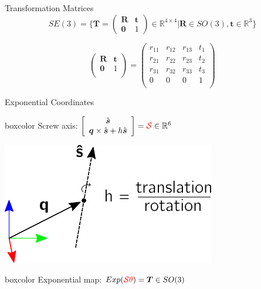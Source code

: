 \documentclass[14pt]{beamer}
\begin{document}
\begin{frame}{Transformation Matrices}
\[
SE(3) = \biggl\{ \boldsymbol{T} = \left(
\begin{array}{cc}
\boldsymbol{R} & \boldsymbol{t}\\
\boldsymbol{0} & 1
\end{array}
\right) \in \mathbb{R}^{4 \times 4}
| \boldsymbol{R} \in SO(3), \boldsymbol{t} \in \mathbb{R}^3 \biggr\}
\]

\[
\left( \begin{array}{cc}
    \boldsymbol R & \boldsymbol t\\
    \boldsymbol 0 & 1\\
\end{array} \right)
=
\left(
\begin{matrix}
r_{11} & r_{12} & r_{13} & t_1\\
r_{21} & r_{22} & r_{23} & t_2\\
r_{31} & r_{32} & r_{33} & t_3\\
0 & 0 & 0 & 1\\
\end{matrix}
\right)
\]
\end{frame}

\begin{frame}{Exponential Coordinates}
\begin{beamercolorbox}[wd=\textwidth,sep=1em]{boxcolor}
Screw axis: $\left[ \begin{array}{c}\hat{\boldsymbol{s}} \\ \boldsymbol{q} \times \hat{\boldsymbol{s}} + h \hat{\boldsymbol{s}}\end{array} \right] = \textcolor{red}{\mathcal{S}} \in \mathbb{R}^6$
\end{beamercolorbox}

\vfill

\hfill\includegraphics{images/screw_axis}

\vfill

\begin{beamercolorbox}[wd=\textwidth,sep=1em]{boxcolor}
Exponential map: $Exp(\textcolor{red}{\mathcal{S}\theta}) = \boldsymbol{T}
\in SO(3)$
\end{beamercolorbox}
\end{frame}
\end{document}
